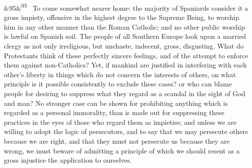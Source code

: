\documentclass[12pt]{article}
\newcommand{\para}[1][]{\par\noindent\ifx&#1&\else\textsuperscript{\footnotesize #1}~\fi}
\begin{document}
\para[95] To come somewhat nearer home: the majority of Spaniards consider it a gross impiety, offensive in the highest degree to the Supreme Being, to worship him in any other manner than the Roman Catholic; and no other public worship is lawful on Spanish soil. The people of all Southern Europe look upon a married clergy as not only irreligious, but unchaste, indecent, gross, disgusting. What do Protestants think of these perfectly sincere feelings, and of the attempt to enforce them against non-Catholics? Yet, if mankind are justified in interfering with each other's liberty in things which do not concern the interests of others, on what principle is it possible consistently to exclude these cases? or who can blame people for desiring to suppress what they regard as a scandal in the sight of God and man? No stronger case can be shown for prohibiting anything which is regarded as a personal immorality, than is made out for suppressing these practices in the eyes of those who regard them as impieties; and unless we are willing to adopt the logic of persecutors, and to say that we may persecute others because we are right, and that they must not persecute us because they are wrong, we must beware of admitting a principle of which we should resent as a gross injustice the application to ourselves.
\end{document}
